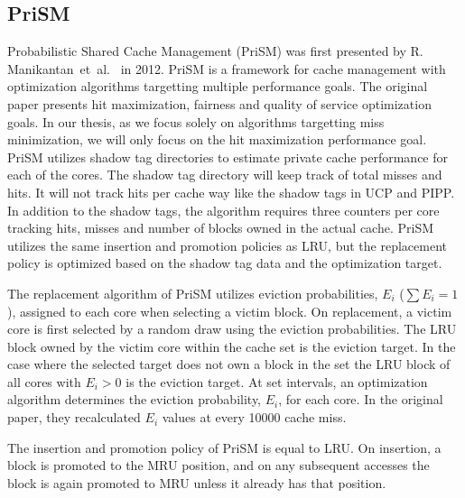 \subsection{PriSM}
\label{sec:background:algorithms:prism}

Probabilistic Shared Cache Management (PriSM) was first presented by R. Manikantan~et~al.~\cite{Manikantan2012} in 2012.
PriSM is a framework for cache management with optimization algorithms targetting multiple performance goals.
The original paper presents hit maximization, fairness and quality of service optimization goals.
In our thesis, as we focus solely on algorithms targetting miss minimization, we will only focus on the hit maximization performance goal.
PriSM utilizes shadow tag directories to estimate private cache performance for each of the cores.
The shadow tag directory will keep track of total misses and hits.
It will not track hits per cache way like the shadow tags in UCP and PIPP.
In addition to the shadow tags, the algorithm requires three counters per core tracking hits, misses and number of blocks owned in the actual cache.
PriSM utilizes the same insertion and promotion policies as LRU, but the replacement policy is optimized based on the shadow tag data and the optimization target.

The replacement algorithm of PriSM utilizes eviction probabilities, $E_i$ ($\sum{E_i} = 1$), assigned to each core when selecting a victim block.
On replacement, a victim core is first selected by a random draw using the eviction probabilities.
The LRU block owned by the victim core within the cache set is the eviction target.
In the case where the selected target does not own a block in the set the LRU block of all cores with $E_i > 0$ is the eviction target.
At set intervals, an optimization algorithm determines the eviction probability, $E_i$, for each core.
In the original paper, they recalculated $E_i$ values at every 10000 cache miss.

The insertion and promotion policy of PriSM is equal to LRU.
On insertion, a block is promoted to the MRU position, and on any subsequent accesses the block is again promoted to MRU unless it already has that position.

